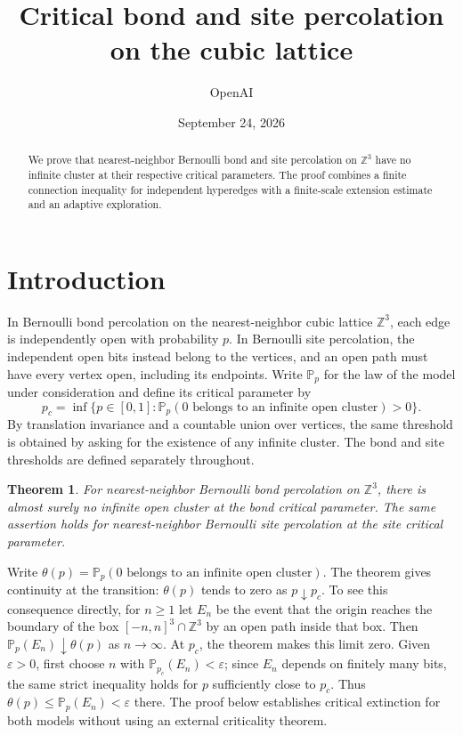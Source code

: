 \documentclass[11pt]{article}
\title{Critical bond and site percolation on the cubic lattice}
\author{OpenAI}
\date{September 24, 2026}
\newtheorem{theorem}{Theorem}[section]
\theoremstyle{definition}
\theoremstyle{remark}
\numberwithin{equation}{section}
\begin{document}
\maketitle
\begin{abstract}
We prove that nearest-neighbor Bernoulli bond and site percolation on
$\mathbb Z^3$ have no infinite cluster at their respective critical parameters.
The proof combines a finite connection inequality for independent hyperedges
with a finite-scale extension estimate and an adaptive exploration.
\end{abstract}
\section{Introduction}

In Bernoulli bond percolation on the nearest-neighbor cubic lattice
$\mathbb Z^3$, each edge is independently open with probability $p$.
In Bernoulli site percolation, the independent open bits instead belong to
the vertices, and an open path must have every vertex open, including its
endpoints. Write $\mathbb P_p$ for the law of the model under consideration
and define its critical parameter by
\[
 p_c=\inf\{p\in[0,1]:
       \mathbb P_p(0\text{ belongs to an infinite open cluster})>0\}.
\]
By translation invariance and a countable union over vertices, the same
threshold is obtained by asking for the existence of any infinite cluster.
The bond and site thresholds are defined separately throughout.

\begin{theorem}\label{thm:main}
For nearest-neighbor Bernoulli bond percolation on $\mathbb Z^3$, there is
almost surely no infinite open cluster at the bond critical parameter.
The same assertion holds for nearest-neighbor Bernoulli site percolation
at the site critical parameter.
\end{theorem}

Write $\theta(p)=\mathbb P_p(0\text{ belongs to an infinite open cluster})$.
The theorem gives continuity at the transition: $\theta(p)$ tends to
zero as $p\downarrow p_c$. To see this consequence directly, for $n\ge1$ let $E_n$ be
the event that the origin reaches the boundary of the box
$[-n,n]^3\cap\mathbb Z^3$ by an open path inside that box. Then
$\mathbb P_p(E_n)\downarrow\theta(p)$ as $n\to\infty$. At $p_c$, the
theorem makes this limit zero. Given $\varepsilon>0$, first choose $n$
with $\mathbb P_{p_c}(E_n)<\varepsilon$; since $E_n$ depends on finitely
many bits, the same strict inequality holds for $p$ sufficiently close
to $p_c$. Thus $\theta(p)\le\mathbb P_p(E_n)<\varepsilon$ there.
The proof below establishes critical extinction for both models without
using an external criticality theorem.
\end{document}
